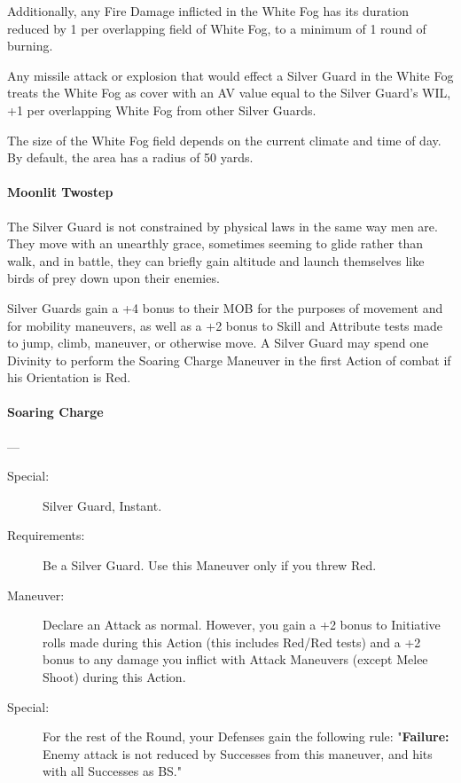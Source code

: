 \documentclass[oneside,11pt,english]{book}
\begin{document}
Additionally, any Fire Damage inflicted in the White Fog has its duration reduced by 1 per 
overlapping field of White Fog, to a minimum of 1 round of burning. 


Any missile attack or explosion that would effect a Silver Guard in the White Fog treats the White Fog as cover with an AV value equal to the Silver Guard's WIL, +1 per overlapping White Fog from other Silver Guards. 


The size of the White Fog field depends on the current climate and time of day. By default, the area has a radius of 50 yards.
\paragraph{Moonlit Twostep}
The Silver Guard is not constrained by physical laws in the same way men are. They move with 
an unearthly grace, sometimes seeming to glide rather than walk, and in battle, they can briefly 
gain altitude and launch themselves like birds of prey down upon their enemies. 


Silver Guards gain a +4 bonus to their MOB for the purposes of movement and for mobility 
maneuvers, as well as a +2 bonus to Skill and Attribute tests made to jump, climb, maneuver, or 
otherwise move. A Silver Guard may spend one Divinity to perform the Soaring Charge 
Maneuver in the first Action of combat if his Orientation is Red. 


\paragraph{\label{man:Soaring Charge}Soaring Charge}---
\begin{description}
\item [Special:] Silver Guard, Instant. 
\item [Requirements:] Be a Silver Guard. Use this Maneuver only if you threw Red. 
\item [Maneuver:] Declare an Attack as normal. However, you gain a +2 bonus to Initiative rolls made during this Action (this includes Red/Red tests) and a +2 bonus to any damage you inflict with Attack Maneuvers (except Melee Shoot) during this Action.
\item [Special:] For the rest of the Round, your Defenses gain the following rule: "\textbf{Failure:} Enemy attack is not reduced by Successes from this maneuver, and hits with all Successes as BS."
\end{description}
\end{document}
